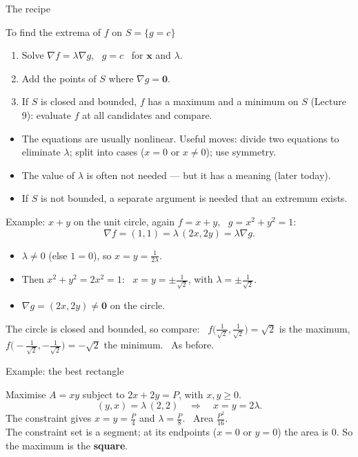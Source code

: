 \documentclass[10pt]{wosm-slides}
\newcommand{\vx}{\mathbf{x}}
\begin{document}
\begin{frame}{The recipe}
  \begin{block}{To find the extrema of $f$ on $S = \{g = c\}$}
    \begin{enumerate}
      \item Solve $\nabla f = \lambda\nabla g$, \ $g = c$ \ for $\vx$ and $\lambda$.
      \item Add the points of $S$ where $\nabla g = \mathbf 0$.
      \item If $S$ is closed and bounded, $f$ has a maximum and a minimum on $S$ (Lecture 9):
        evaluate $f$ at all candidates and compare.
    \end{enumerate}
  \end{block}
  \pause
  \begin{itemize}
    \item The equations are usually nonlinear. Useful moves: divide two equations to eliminate
      $\lambda$; split into cases ($x = 0$ or $x \ne 0$); use symmetry.
    \item The value of $\lambda$ is often not needed --- but it has a meaning (later today).
    \item If $S$ is not bounded, a separate argument is needed that an extremum exists.
  \end{itemize}
\end{frame}

\begin{frame}{Example: $x + y$ on the unit circle, again}
  $f = x + y$, \ $g = x^2 + y^2 = 1$:
  \[ \nabla f = (1, 1) = \lambda\,(2x, 2y) = \lambda\nabla g . \]
  \pause
  \begin{itemize}
    \item $\lambda \ne 0$ (else $1 = 0$), so $x = y = \frac{1}{2\lambda}$.
    \item Then $x^2 + y^2 = 2x^2 = 1$: \ $x = y = \pm\frac1{\sqrt2}$, with $\lambda = \pm\frac1{\sqrt2}$.
    \item $\nabla g = (2x, 2y) \ne \mathbf 0$ on the circle.
  \end{itemize}
  \pause
  The circle is closed and bounded, so compare: \
  $f\bigl(\frac1{\sqrt2}, \frac1{\sqrt2}\bigr) = \sqrt2$ is the maximum,
  $f\bigl(-\frac1{\sqrt2}, -\frac1{\sqrt2}\bigr) = -\sqrt2$ the minimum. \ As before.
\end{frame}

\begin{frame}{Example: the best rectangle}
  \begin{example}
    Maximise $A = xy$ subject to $2x + 2y = P$, with $x, y \ge 0$.
    \pause
    \[ (y, x) = \lambda\,(2, 2) \quad\Longrightarrow\quad x = y = 2\lambda . \]
    The constraint gives $x = y = \frac P4$ and $\lambda = \frac P8$. \ Area $\frac{P^2}{16}$.
    \pause
    \\[0.3em] The constraint set is a segment; at its endpoints ($x = 0$ or $y = 0$) the area is $0$.
    So the maximum is the \textbf{square}.
  \end{example}
\end{frame}
\end{document}
